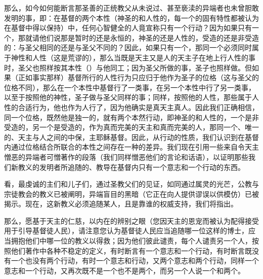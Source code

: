 那么，如今如何能断言那圣善的正统教父从未说过、甚至亵渎的异端者也未曾胆敢发明的事，即：在基督的两个本性（神圣的和人性的，每一个的固有特性都被认为在基督中得以保持）中，任何心智健全的人竟宣称只有一个行动？因为如果只有一个，那就请他们说那是暂时的还是永恒的，神圣的还是人性的，受造的还是非受造的：与圣父相同的还是与圣父不同的？因此，如果只有一个，那同一个必须同时属于神性和人性（这是荒谬的），那么当既是天主又是人的天主子在地上行人性的事时，圣父也照样按其本性（）与他同工；因为圣父所做的事，圣子也照样做。但如果（正如事实那样）基督所行的人性行为只应归于他作为圣子的位格（这与圣父的位格不同），那么在一个本性中基督行了一类事，在另一个本性中行了另一类事，以至于按照他的神性，圣子做与圣父同样的事；同样，按照他的人性，那些属于人性的合适行为，他也作为人行了，因为他确实是真天主真人。因此我们正确相信，同一个位格，既然他是独一的，就有两个本然行动，即神圣的和人性的，一个是非受造的，另一个是受造的，作为真而完美的天主和真而完美的人，那同一个、唯一的、天主与人之间的中保，主耶稣基督。因此，从行动的性质，我们认识到在基督内通过位格结合所联合的本性之间存在一种的差异。我们现在引用一些来自令天主憎恶的异端者可憎著作的段落（我们同样憎恶他们的言论和话语），以证明那些我们新教义的发明者所追随的、教导在基督内只有一个意志和一个行动的东西。\par

\par

看，最虔诚的主们和儿子们，通过圣教父们的见证，如同通过属灵的光芒，公教与宗徒教会的教义已被阐明，异端盲目的黑暗（它正在向人提供谬误以供模仿）已被揭示。现在，这新教义必须追随某人，且是靠谁的权威支持，我们将指出。\par

\par

那么，愿基于天主的仁慈，以内在的辨别之眼（您因天主的恩宠而被认为配得接受用于引导基督徒人民），请注意您认为基督徒人民应当追随哪一位这样的博士，应当拥抱他们中哪一位的教义以得救；因为他们彼此谴责，每个人谴责另一个人，按照他们著作中各种不稳定的定义，有时断言有一个意志和一个行动，有时断言既没有一个也没有两个行动，有时一个意志和行动，又两个意志和两个行动，同样一个意志和一个行动，又再次既不是一个也不是两个，而另一个人说一个和两个。\par

